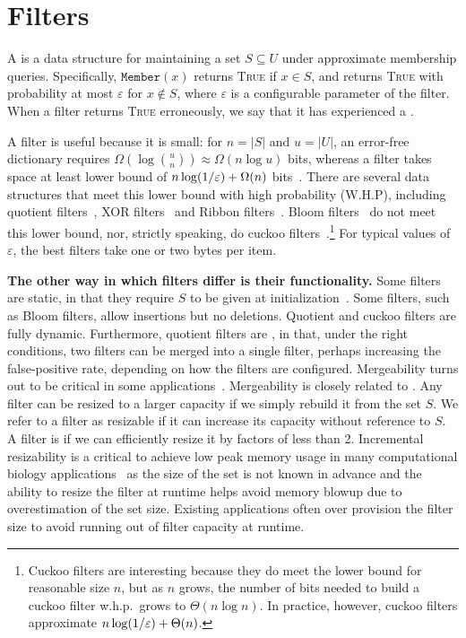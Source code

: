 
\section{Filters}

A  is a data structure for maintaining a set $S\subseteq U$ under approximate membership queries. Specifically, $\texttt{Member}(x)$ returns \textsc{True} if $x\in S$, and returns \textsc{True} with probability at most $\varepsilon$ for $x\notin S$, where $\varepsilon$ is a configurable parameter of the filter.  When a filter returns \textsc{True} erroneously, we say that it has experienced a .

A filter is useful because it is small: for $n= |S|$ and $u = |U|$, an error-free dictionary requires $\Omega(\log {u\choose n}) \approx \Omega(n \log u)$ bits, whereas a filter  takes space at least  lower bound of $n\log (1/\varepsilon) + \Omega(n)$ bits~\cite{CarterFG78}.  There are several data structures that meet this lower bound with high probability (W.H.P), including quotient filters~\cite{Cleary84,PaghPaRa05,DillingerM09,BenderFaJo12,PandeyBJP17,PandeyCDBFJ21}, XOR filters~\cite{GrafLe20} and Ribbon filters~\cite{DillingerW21}.  Bloom filters~\cite{Bloom70} do not meet this lower bound, nor, strictly speaking, do cuckoo filters~\cite{FanAnKa14,BreslowJ18}.\footnote{Cuckoo filters are interesting because they do meet the lower bound for reasonable size $n$, but as $n$ grows, the number of bits needed to build a cuckoo filter w.h.p.\ grows to $\Theta(n\log n)$.  In practice, however, cuckoo filters approximate $n\log (1/\varepsilon) + \Theta(n)$.}
%
For typical values of $\varepsilon$, the best filters take one or two bytes per item.

\noindent
\textbf{The other way in which filters differ is their functionality.} Some filters are static, in that they require $S$ to be given at initialization~\cite{GrafLe20,DillingerW21}.  Some filters, such as Bloom filters, allow insertions but no deletions.  Quotient and cuckoo filters are fully dynamic.  Furthermore, quotient filters are , in that, under the right conditions, two filters can be merged into a single filter, perhaps increasing the false-positive rate, depending on how the filters are configured.  Mergeability turns out to be critical in some applications~\cite{conway2020splinterdb,PandeyABFJP18Cell}. Mergeability is closely related to .  Any filter can be resized to a larger capacity if we  simply rebuild it from the set $S$.  We refer to a filter as resizable if it can increase its capacity without reference to $S$.  A filter is  if we can efficiently resize it by factors of less than 2.  Incremental resizability is a critical to achieve low peak memory usage in many computational biology applications~\cite{hofmeyr2020terabase,PandeyBJP17,PandeyBJP17a,MarccaisKi11,wood2014kraken,wood2019improved} as the size of the set is not known in advance and the ability to resize the filter at runtime helps avoid memory blowup due to overestimation of the set size. Existing applications often over provision the filter size to avoid running out of filter capacity at runtime.

